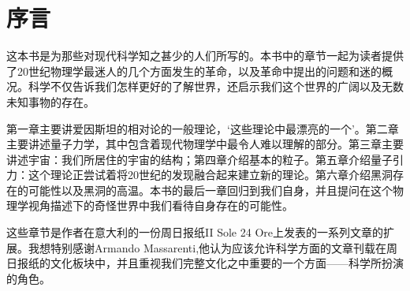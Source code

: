 	\chapter*{序言}
	\indent

这本书是为那些对现代科学知之甚少的人们所写的。本书中的章节一起为读者提供了20世纪物理学最迷人的几个方面发生的革命，以及革命中提出的问题和迷的概况。科学不仅告诉我们怎样更好的了解世界，还启示我们这个世界的广阔以及无数未知事物的存在。

第一章主要讲爱因斯坦的相对论的一般理论，‘这些理论中最漂亮的一个’。第二章主要讲述量子力学，其中包含着现代物理学中最令人难以理解的部分。第三章主要讲述宇宙：我们所居住的宇宙的结构；第四章介绍基本的粒子。第五章介绍量子引力：这个理论正尝试着将20世纪的发现融合起来建立新的理论。第六章介绍黑洞存在的可能性以及黑洞的高温。本书的最后一章回归到我们自身，并且提问在这个物理学视角描述下的奇怪世界中我们看待自身存在的可能性。

这些章节是作者在意大利的一份周日报纸II Sole 24 Ore上发表的一系列文章的扩展。我想特别感谢Armando Massarenti,他认为应该允许科学方面的文章刊载在周日报纸的文化板块中，并且重视我们完整文化之中重要的一个方面——科学所扮演的角色。
	\noindent